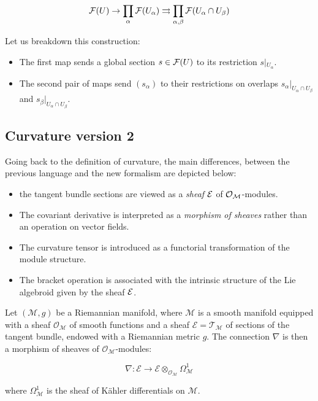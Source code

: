 \[\mathcal{F}(U)\to \prod_\alpha\mathcal{F}(U_{\alpha}) \rightrightarrows \prod_{\alpha,\beta}\mathcal{F}(U_{\alpha}\cap U_{\beta})\]

Let us breakdown this construction: 

\begin{itemize}
    \item The first map sends a global section $s\in \mathcal{F}(U)$ to its restriction $s|{_{U_\alpha}}$.
    \item The second pair of maps send $(s_{\alpha})$ to their restrictions on overlaps $s_{\alpha}|_{{{U_\alpha}\cap U_{\beta}}}$ and $s_{\beta}|_{{{U_\alpha}\cap U_{\beta}}}$.
\end{itemize}

\subsection{Curvature version 2}
Going back to the definition of curvature, the main differences, between the previous language and the new formalism are depicted below:
\begin{itemize}
    \item the tangent bundle sections are viewed as a \emph{sheaf} $\mathcal{E}$ of $\mathcal{O}_{\mathcal{M}}$-modules. 

  \item The covariant derivative is interpreted as a \emph{morphism of sheaves} rather than an operation on vector fields.

  \item The curvature tensor is introduced as a functorial transformation of the module structure.
  
  \item The bracket operation is associated with the intrinsic structure of the Lie algebroid given by the sheaf 
$\mathcal{E}$.

\end{itemize}

Let $(\mathcal{M}, g)$ be a Riemannian manifold, where $\mathcal{M}$ is a smooth manifold equipped with a sheaf $\mathcal{O}_{\mathcal{M}}$ of smooth functions and a sheaf $\mathcal{E} = \mathcal{T}_{\mathcal{M}}$ of sections of the tangent bundle, endowed with a Riemannian metric $g$. The connection $\nabla$ is then a morphism of sheaves of $\mathcal{O}_{\mathcal{M}}$-modules:

\[
\nabla: \mathcal{E} \to \mathcal{E} \otimes_{\mathcal{O}_{\mathcal{M}}} \Omega^1_{\mathcal{M}}
\]

where $\Omega^1_{\mathcal{M}}$ is the sheaf of Kähler differentials on $\mathcal{M}$.

